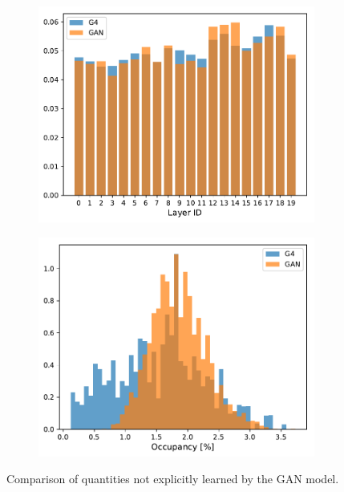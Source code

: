 \begin{figure}
    \centering
    \captionsetup[subfigure]{justification=centering}
    \begin{subfigure}[t]{0.38\textwidth}
        \centering
        \hspace{-1cm} %
        \includegraphics[width=\textwidth]{chapter4/comp_layer.pdf}
    \end{subfigure}
    \hspace{2cm}
    \begin{subfigure}[t]{0.38\textwidth}
        \centering
        \hspace{-1cm} %
        \includegraphics[width=\textwidth]{chapter4/occupancy.pdf}
    \end{subfigure}
    \caption{
        Comparison of quantities not explicitly learned by the GAN model.
    }
    \label{fig:comp_nonlearned}
\end{figure}


